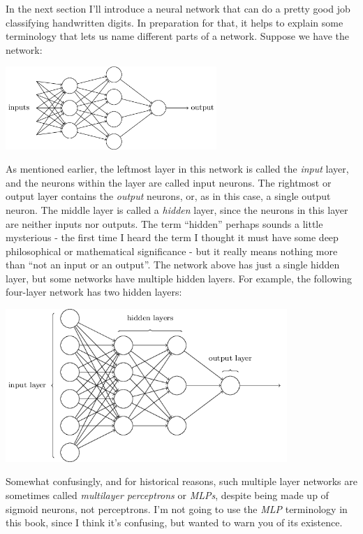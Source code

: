 In the next section I'll introduce a neural network that can do a pretty good job classifying handwritten digits. In preparation for that, it helps to explain some terminology that lets us name different parts of a network. Suppose we have the network: 

{\centering
\includegraphics[width=0.6\textwidth,]{pic/three-layer-nn01}
\par}


As mentioned earlier, the leftmost layer in this network is called the \textit{input} layer, and the neurons within the layer are called input neurons. The rightmost or output layer contains the \textit{output} neurons, or, as in this case, a single output neuron. The middle layer is called a \textit{hidden} layer, since the neurons in this layer are neither inputs nor outputs. The term ``hidden'' perhaps sounds a little mysterious - the first time I heard the term I thought it must have some deep philosophical or mathematical significance - but it really means nothing more than ``not an input or an output''. The network above has just a single hidden layer, but some networks have multiple hidden layers. For example, the following four-layer network has two hidden layers: 

{\centering
\includegraphics[width=0.8\textwidth,]{pic/four-layer-nn01}
\par}



Somewhat confusingly, and for historical reasons, such multiple layer networks are sometimes called \textit{multilayer perceptrons} or \textit{MLPs}, despite being made up of sigmoid neurons, not perceptrons. I'm not going to use the \textit{MLP} terminology in this book, since I think it's confusing, but wanted to warn you of its existence.

